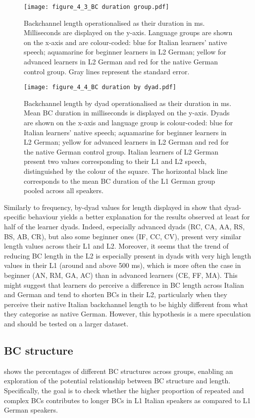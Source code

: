 \begin{figure}[p]
\texttt{[image: figure\_4\_3\_BC duration group.pdf]}
\caption{Backchannel length operationalised as their duration in ms. Milliseconds are displayed on the y-axis. Language groups are shown on the x-axis and are colour-coded: blue for Italian learners’ native speech; aquamarine for beginner learners in L2 German; yellow for advanced learners in L2 German and red for the native German control group. Gray lines represent the standard error.}
\label{fig:4.3}
\end{figure}
\begin{figure}[p]
\texttt{[image: figure\_4\_4\_BC duration by dyad.pdf]}
\caption{Backchannel length by dyad operationalised as their duration in ms. Mean BC duration in milliseconds is displayed on the y-axis. Dyads are shown on the x-axis and language group is colour-coded: blue for Italian learners’ native speech; aquamarine for beginner learners in L2 German; yellow for advanced learners in L2 German and red for the native German control group. Italian learners of L2 German present two values corresponding to their L1 and L2 speech, distinguished by the colour of the square. The horizontal black line corresponds to the mean BC duration of the L1 German group pooled across all speakers.}
\label{fig:4.4}
\end{figure}

Similarly to frequency, by-dyad values for length displayed in  show that dyad-specific behaviour yields a better explanation for the results observed at least for half of the learner dyads. Indeed, especially advanced dyads (RC, CA, AA, RS, BS, AB, CR), but also some beginner ones (IF, CC, CV), present very similar length values across their L1 and L2. Moreover, it seems that the trend of reducing BC length in the L2 is especially present in dyads with very high length values in their L1 (around and above 500 ms), which is more often the case in beginner (AN, RM, GA, AC) than in advanced learners (CE, FF, MA). This might suggest that learners do perceive a difference in BC length across Italian and German and tend to shorten BCs in their L2, particularly when they perceive their native Italian backchannel length to be highly different from what they categorise as native German. However, this hypothesis is a mere speculation and should be tested on a larger dataset.



\subsection{BC structure}
\label{sec:4.3.3}
 shows the percentages of different BC structures across groups, enabling an exploration of the potential relationship between BC structure and length. Specifically, the goal is to check whether the higher proportion of repeated and complex BCs contributes to longer BCs in L1 Italian speakers as compared to L1 German speakers.

